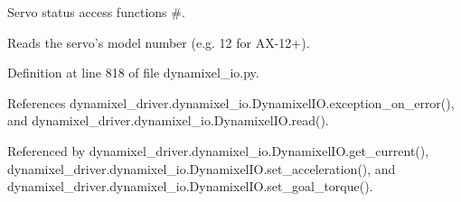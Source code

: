 Servo status access functions \#. 

\begin{DoxyVerb}Reads the servo's model number (e.g. 12 for AX-12+). \end{DoxyVerb}
 

Definition at line 818 of file dynamixel\+\_\+io.\+py.



References dynamixel\+\_\+driver.\+dynamixel\+\_\+io.\+Dynamixel\+I\+O.\+exception\+\_\+on\+\_\+error(), and dynamixel\+\_\+driver.\+dynamixel\+\_\+io.\+Dynamixel\+I\+O.\+read().



Referenced by dynamixel\+\_\+driver.\+dynamixel\+\_\+io.\+Dynamixel\+I\+O.\+get\+\_\+current(), dynamixel\+\_\+driver.\+dynamixel\+\_\+io.\+Dynamixel\+I\+O.\+set\+\_\+acceleration(), and dynamixel\+\_\+driver.\+dynamixel\+\_\+io.\+Dynamixel\+I\+O.\+set\+\_\+goal\+\_\+torque().


